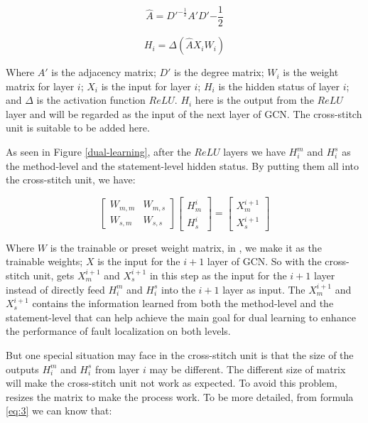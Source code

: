 \begin{equation}\label{eq:1}
	\hat{A} = D'^{-\frac{1}{2}}A'D'{-\frac{1}{2}}
\end{equation}

\begin{equation}\label{eq:2}
	H_i = \Delta(\hat{A}X_iW_i)
\end{equation}

Where $A'$ is the adjacency matrix; $D'$ is the degree matrix; $W_i$ is the weight matrix for layer $i$; $X_i$ is the input for layer $i$; $H_i$ is the hidden status of layer $i$; and $\Delta$ is the activation function $ReLU$. $H_i$ here is the output from the $ReLU$ layer and will be regarded as the input of the next layer of GCN. The cross-stitch unit is suitable to be added here.

As seen in Figure \ref{dual-learning}, after the $ReLU$ layers we have $H_i^m$ and $H_i^s$ as the method-level and the statement-level hidden status. By putting them all into the cross-stitch unit, we have:

\begin{equation}\label{eq:3}
	\begin{bmatrix}
		W_{m,m} &  W_{m,s} \\
		W_{s,m} &  W_{s,s}
	\end{bmatrix}
	\begin{bmatrix}
		H_m^{i}\\
		H_s^{i}
	\end{bmatrix}=
	\begin{bmatrix}
		X_m^{i+1}\\
		X_s^{i+1}
	\end{bmatrix}
\end{equation}

Where $W$ is the trainable or preset weight matrix, in \tool, we make it as the trainable weights; $X$ is the input for the $i+1$ layer of GCN. So with the cross-stitch unit, \tool gets $X_m^{i+1}$ and $X_s^{i+1}$ in this step as the input for the $i+1$ layer instead of directly feed $H_i^m$ and $H_i^s$ into the $i+1$ layer as input. The $X_m^{i+1}$ and $X_s^{i+1}$ contains the information learned from both the method-level and the statement-level that can help achieve the main goal for dual learning to enhance the performance of fault localization on both levels.

But one special situation \tool may face in the cross-stitch unit is that the size of the outputs $H_i^m$ and $H_i^s$ from layer $i$ may be different. The different size of matrix will make the cross-stitch unit not work as expected. To avoid this problem, \tool resizes the matrix to make the process work. To be more detailed, from formula \ref{eq:3} we can know that:

